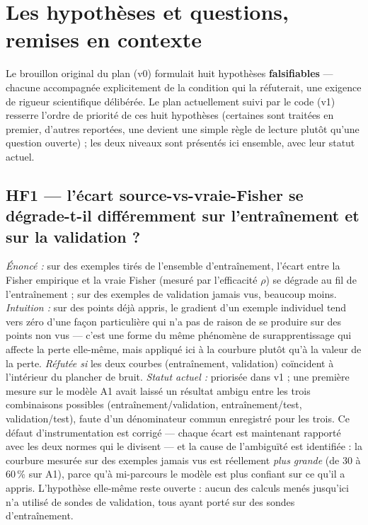 \documentclass[11pt,a4paper]{article}
\begin{document}
\section{Les hypothèses et questions, remises en contexte}
\label{sec:hypotheses}

Le brouillon original du plan (v0) formulait huit hypothèses \textbf{falsifiables} — chacune
accompagnée explicitement de la condition qui la réfuterait, une exigence de rigueur scientifique
délibérée. Le plan actuellement suivi par le code (v1) resserre l'ordre de priorité de ces huit
hypothèses (certaines sont traitées en premier, d'autres reportées, une devient une simple règle de
lecture plutôt qu'une question ouverte) ; les deux niveaux sont présentés ici ensemble, avec leur
statut actuel.

\subsection*{HF1 — l'écart source-vs-vraie-Fisher se dégrade-t-il différemment sur l'entraînement et sur la validation ?}
\textit{Énoncé :} sur des exemples tirés de l'ensemble d'entraînement, l'écart entre la Fisher
empirique et la vraie Fisher (mesuré par l'efficacité $\rho$) se dégrade au fil de l'entraînement ;
sur des exemples de validation jamais vus, beaucoup moins. \textit{Intuition :} sur des points déjà
appris, le gradient d'un exemple individuel tend vers zéro d'une façon particulière qui n'a pas de
raison de se produire sur des points non vus — c'est une forme du même phénomène de surapprentissage
qui affecte la perte elle-même, mais appliqué ici à la courbure plutôt qu'à la valeur de la perte.
\textit{Réfutée si} les deux courbes (entraînement, validation) coïncident à l'intérieur du plancher
de bruit. \textit{Statut actuel :} priorisée dans v1 ; une première mesure sur le modèle A1 avait laissé un
résultat ambigu entre les trois combinaisons possibles (entraînement/validation, entraînement/test,
validation/test), faute d'un dénominateur commun enregistré pour les trois. Ce défaut
d'instrumentation est corrigé — chaque écart est maintenant rapporté avec les deux normes qui le
divisent — et la cause de l'ambiguïté est identifiée : la courbure mesurée sur des exemples jamais
vus est réellement \emph{plus grande} (de 30 à 60\,\% sur A1), parce qu'à mi-parcours le modèle est
plus confiant sur ce qu'il a appris. L'hypothèse elle-même reste ouverte : aucun des calculs menés
jusqu'ici n'a utilisé de sondes de validation, tous ayant porté sur des sondes d'entraînement.
\end{document}
